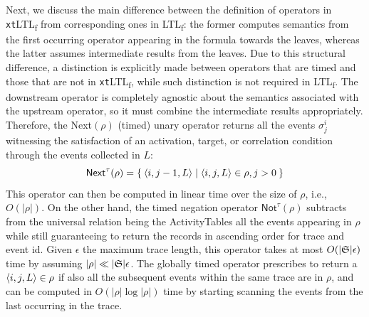 \documentclass[sigconf]{acmart}
\begin{document}
Next, we discuss the main difference between the definition of operators in  \texttt{xt}LTL\textsubscript{f} from corresponding ones in LTL\textsubscript{f}: the former computes semantics from the first occurring operator appearing in the formula towards the leaves, whereas the latter assumes intermediate results from the leaves. 		Due to this structural difference, a distinction is explicitly made between operators that are timed and those that are not in \texttt{xt}LTL\textsubscript{f}, while such distinction is not required in LTL\textsubscript{f}. The downstream operator is completely agnostic about the semantics associated with the upstream operator, so it must combine the intermediate results appropriately. Therefore, the \textsf{Next}$(\rho)$ (timed) unary operator returns all the events $\sigma^i_j$ witnessing the satisfaction of an activation, target, or correlation condition through the events collected in $L$:
\[\textsf{Next}^\tau(\rho)=\Set{\braket{i,j-1,L}|\braket{i,j,L}\in\rho,j>0}\]
This operator can then be computed in linear time over the size of $\rho$, i.e., $O(|\rho|)$.
On the other hand, the timed negation operator $\textsf{Not}^\tau(\rho)$ subtracts from the universal relation being the \textsf{ActivityTables} all the events appearing in $\rho$ while still guaranteeing to return the records in ascending order for trace and event id. Given $\epsilon$ the maximum trace length, this operator takes at most $O(|\mathfrak{S}|\epsilon)$ time by assuming $|\rho|\ll |\mathfrak{S}|\epsilon$. The globally timed operator prescribes to return a $\braket{i,j,L}\in\rho$ if also all the subsequent events within the same trace are in $\rho$, and can be computed in $O(|\rho| \log|\rho|)$ time by starting scanning the events from the last occurring in the trace.  
\end{document}
